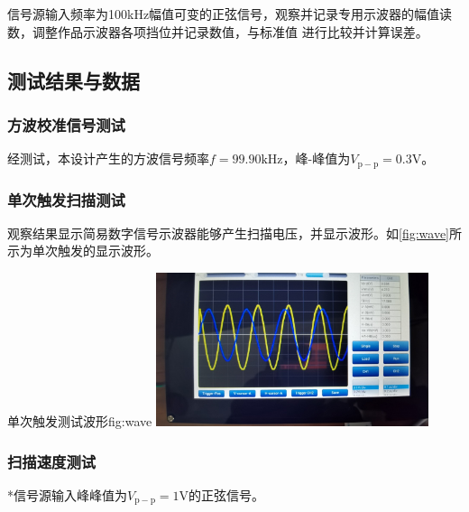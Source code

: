 \documentclass[supercite]{HustGraduPaper}
\begin{document}
	信号源输入频率为100kHz幅值可变的正弦信号，观察并记录专用示波器的幅值读数，调整作品示波器各项挡位并记录数值，与标准值
	进行比较并计算误差。

	\subsection{测试结果与数据}
	
	\subsubsection{方波校准信号测试}
	经测试，本设计产生的方波信号频率$ f=99.90\mathrm{kHz} $，峰-峰值为$ V_\mathrm{p-p}  = 0.3\mathrm{V}  $。
	
	
	\subsubsection{单次触发扫描测试}
	
	观察结果显示简易数字信号示波器能够产生扫描电压，并显示波形。如\autoref{fig:wave}所示为单次触发的显示波形。
	
	\begin{generalfig}[htb]{单次触发测试波形}{fig:wave}
		\includegraphics[width=8cm]{Figures/wave.jpg}
	\end{generalfig}
	
	
	\subsubsection{扫描速度测试}
	*信号源输入峰峰值为$ V_\mathrm{p-p}  = 1\mathrm{V}  $的正弦信号。
\end{document}
